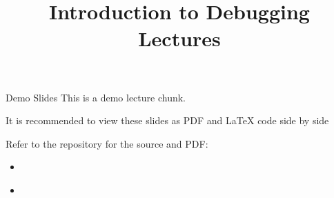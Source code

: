 \documentclass[11pt,compress,t,notes=noshow, xcolor=table]{beamer}
\title{Introduction to Debugging Lectures}
\begin{document}

\begin{frame}{Demo Slides}
  This is a demo lecture chunk.

  It is recommended to view these slides as PDF and LaTeX code side by side

  Refer to the  repository for the source and PDF:
  \begin{itemize}
    \item \href{https://slds-lmu.github.io/lecture_debug/lecture_debug/slides/debug/slides-debug-layout.pdf}{}
    \item \href{https://github.com/slds-lmu/lecture_debug/blob/main/slides/debug/slides-debug-layout.tex}{}
  \end{itemize}

\end{frame}
\end{document}
